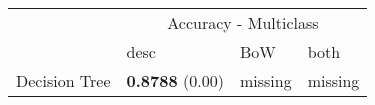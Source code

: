 \begin{tabular}{|l|l|l|l| }
\hline
 &  \multicolumn{3}{c|}{ Accuracy - Multiclass} \\
\cline{2-4} & desc & BoW & both \\ \hline
Decision Tree & {\bf 0.8788} (0.00) & missing  & missing \\
\hline
\end{tabular}